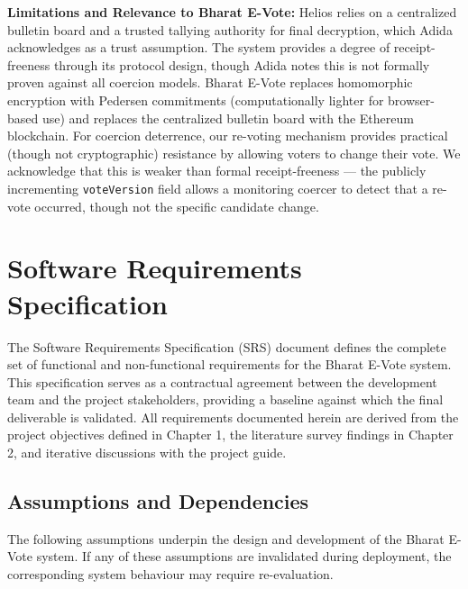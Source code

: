 \documentclass[oneside,a4paper,12pt]{book}
\begin{document}
\textbf{Limitations and Relevance to Bharat E-Vote:} Helios relies on a centralized bulletin board and a trusted tallying authority for final decryption, which Adida acknowledges as a trust assumption. The system provides a degree of receipt-freeness through its protocol design, though Adida notes this is not formally proven against all coercion models. Bharat E-Vote replaces homomorphic encryption with Pedersen commitments (computationally lighter for browser-based use) and replaces the centralized bulletin board with the Ethereum blockchain. For coercion deterrence, our re-voting mechanism provides practical (though not cryptographic) resistance by allowing voters to change their vote. We acknowledge that this is weaker than formal receipt-freeness --- the publicly incrementing \texttt{voteVersion} field allows a monitoring coercer to detect that a re-vote occurred, though not the specific candidate change.

\chapter{Software Requirements Specification}

The Software Requirements Specification (SRS) document defines the complete set of functional and non-functional requirements for the Bharat E-Vote system. This specification serves as a contractual agreement between the development team and the project stakeholders, providing a baseline against which the final deliverable is validated. All requirements documented herein are derived from the project objectives defined in Chapter 1, the literature survey findings in Chapter 2, and iterative discussions with the project guide.

\section{Assumptions and Dependencies}

The following assumptions underpin the design and development of the Bharat E-Vote system. If any of these assumptions are invalidated during deployment, the corresponding system behaviour may require re-evaluation.
\end{document}
